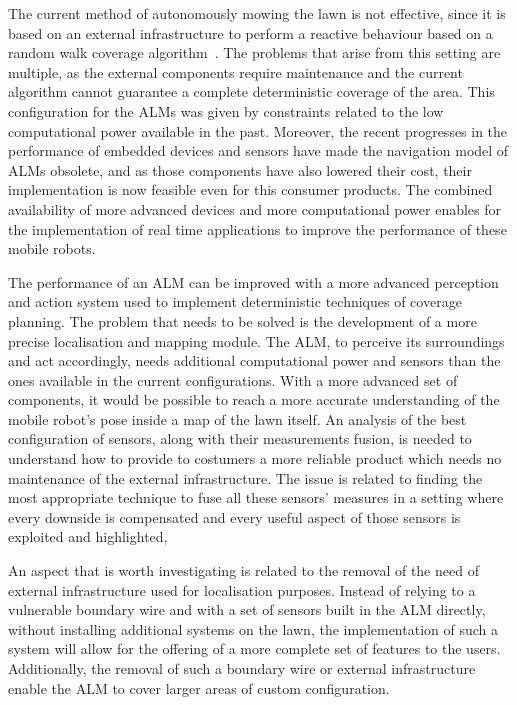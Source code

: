 \noindent
The current method of autonomously mowing the lawn is not effective, since it is based on an external infrastructure to perform a reactive behaviour based on a random walk coverage algorithm~\cite{karol_ardic_conditional_2016}.
The problems that arise from this setting are multiple, as the external components require maintenance and the current algorithm cannot guarantee a complete deterministic coverage of the area.
This configuration for the \glspl{ALM} was given by constraints related to the low computational power available in the past.
Moreover, the recent progresses in the performance of embedded devices and sensors have made the navigation model of \glspl{ALM} obsolete, and as those components have also lowered their cost, their implementation is now feasible even for this consumer products.
The combined availability of more advanced devices and more computational power enables for the implementation of real time applications to improve the performance of these mobile robots.


The performance of an \gls{ALM} can be improved with a more advanced perception and action system used to implement deterministic techniques of coverage planning.
The problem that needs to be solved is the development of a more precise localisation and mapping module.
The \gls{ALM}, to perceive its surroundings and act accordingly, needs additional computational power and sensors than the ones available in the current configurations.
With a more advanced set of components, it would be possible to reach a more accurate understanding of the mobile robot's pose inside a map of the lawn itself.
An analysis of the best configuration of sensors, along with their measurements fusion, is needed to understand how to provide to costumers a more reliable product which needs no maintenance of the external infrastructure.
The issue is related to finding the most appropriate technique to fuse all these sensors' measures in a setting where every downside is compensated and every useful aspect of those sensors is exploited and highlighted,


An aspect that is worth investigating is related to the removal of the need of external infrastructure used for localisation purposes.
Instead of relying to a vulnerable boundary wire and with a set of sensors built in the \gls{ALM} directly, without installing additional systems on the lawn, the implementation of such a system will allow for the offering of a more complete set of features to the users.
Additionally, the removal of such a boundary wire or external infrastructure enable the \gls{ALM} to cover larger areas of custom configuration.

